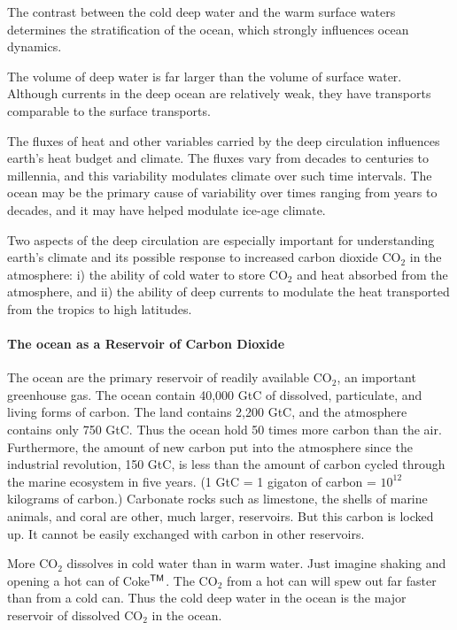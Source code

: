 \begin{enumerate}
\vitem The contrast between the cold deep water and the warm surface
waters determines the stratification of the ocean, which strongly
influences ocean dynamics.

\vitem The volume of deep water is far larger than the volume of
surface water. Although currents in the deep ocean are relatively
weak, they have transports
comparable to the surface transports.

\vitem The fluxes of heat and other variables carried by the deep
circulation influences earth's heat budget and climate. The fluxes
vary from decades to centuries to millennia, and this variability
modulates climate over such time intervals. The ocean may be the
primary cause of variability over times ranging from years to decades,
and it may have helped modulate ice-age climate.

\end{enumerate}
Two aspects of the deep circulation are especially important for
understanding earth's climate and its possible response to increased
carbon dioxide CO$_2$ in the atmosphere: i) the ability of cold water
to store CO$_2$ and heat absorbed from the atmosphere, and ii) the
ability of deep currents to modulate the heat
transported from the tropics to high latitudes.

\paragraph{The ocean as a Reservoir of Carbon Dioxide}
The ocean are the primary reservoir of readily
available CO$_2$, an important greenhouse gas. The ocean contain
40,000 GtC of dissolved, particulate, and living forms of carbon. The
land contains 2,200 GtC, and the atmosphere contains only 750
GtC. Thus the ocean hold 50 times more carbon than the
air. Furthermore, the amount of new carbon put into the atmosphere
since the industrial revolution, 150 GtC, is less than the amount of
carbon cycled through the marine ecosystem in five years. (1 GtC = 1
gigaton of carbon = $10^{12}$ kilograms of carbon.) Carbonate rocks
such as limestone, the shells of marine animals, and coral are other,
much larger, reservoirs. But this carbon is locked up. It cannot be
easily exchanged with carbon in other reservoirs.

More CO$_2$ dissolves in cold water than in warm water. Just imagine
shaking and opening a hot can of Coke$^{\mbox{\textsf{\scriptsize TM}}}$.
The CO$_2$ from a hot can will spew out far faster than
from a cold can. Thus the cold deep water in the ocean is the major
reservoir of dissolved CO$_2$ in the ocean.

